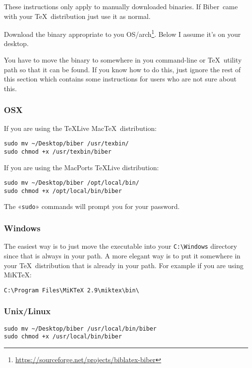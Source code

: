 \documentclass{ltxdockit}
\newcommand*{\biber}{Biber\xspace}
\begin{document}
These instructions only apply to manually downloaded binaries. If
\biber\ came with your \TeX\ distribution just use it as normal.

Download the binary appropriate to you
OS/arch\footnote{\url{https://sourceforge.net/projects/biblatex-biber}}. Below
I assume it's on your desktop.

You have to move the binary to somewhere in you command-line or \TeX\ utility
path so that it can be found. If you know how to do this, just ignore the
rest of this section which contains some instructions for users who are
not sure about this.

\subsubsection{OSX}

If you are using the \TeX Live Mac\TeX\ distribution:

\begin{verbatim}
sudo mv ~/Desktop/biber /usr/texbin/
sudo chmod +x /usr/texbin/biber
\end{verbatim}

\noindent If you are using the MacPorts \TeX Live distribution:

\begin{verbatim}
sudo mv ~/Desktop/biber /opt/local/bin/
sudo chmod +x /opt/local/bin/biber
\end{verbatim}

\noindent The «\verb+sudo+» commands will prompt you for your password.

\subsubsection{Windows}

The easiest way is to just move the executable into your \verb+C:\Windows+ directory since
that is always in your path. A more elegant way is to put it somewhere in
your \TeX\ distribution that is already in your path. For example if you
are using MiK\TeX:

\begin{verbatim}
C:\Program Files\MiKTeX 2.9\miktex\bin\
\end{verbatim}

\subsubsection{Unix/Linux}

\begin{verbatim}
sudo mv ~/Desktop/biber /usr/local/bin/biber
sudo chmod +x /usr/local/bin/biber
\end{verbatim}
\end{document}

